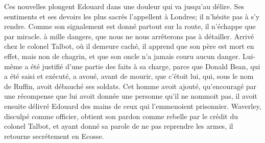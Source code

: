 {Ces nouvelles plongent Edouard dans une douleur qui va jusqu'au délire. Ses sentiments et ses devoirs les plus sacrés l'appellent à Londres; il n'hésite pas à s'y rendre. Comme son signalement est donné partout sur la route, il n'échappe que par miracle.\setcounter{page}{369} à mille dangers, que nous ne nous arrêterons pas à détailler. Arrivé chez le colonel Talbot, où il demeure caché, il apprend que son père est mort en effet, mais non de chagrin, et que son oncle n'a jamais couru aucun danger. Lui-même a été justifié d'une partie des faits à sa charge, parce que Donald Bean, qui a été saisi et exécuté, a avoué, avant de mourir, que c'étoit lui, qui, sous le nom de Ruffin, avoit débauché ses soldats. Cet homme avoit ajouté, qu'encouragé par une récompense que lui avoit donnée une personne qu'il ne nommoit pas, il avoit ensuite délivré Edouard des mains de ceux qui l'emmenoient prisonnier. Waverley, disculpé comme officier, obtient son pardon comme rebelle par le crédit du colonel Talbot, et ayant donné sa parole de ne pas reprendre les armes, il retourne secrétement en Ecosse.
}
